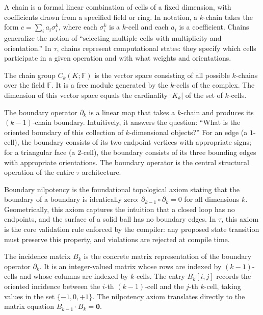 \documentclass[manuscript, nonacm, review=false]{acmart}
\theoremstyle{definition}
\theoremstyle{plain}
\newcommand{\F}{\mathbb{F}}
\newcommand{\toposLang}{\ensuremath{\tau}\text{-Lang}}
\begin{document}
\begin{description}[style=unboxed, leftmargin=0cm, font=\bfseries]
\item[Chain]
A chain is a formal linear combination of cells of a fixed dimension, with coefficients drawn from a specified field or ring. In notation, a $k$-chain takes the form $c = \sum_{i} a_i \sigma_i^k$, where each $\sigma_i^k$ is a $k$-cell and each $a_i$ is a coefficient. Chains generalize the notion of ``selecting multiple cells with multiplicity and orientation.'' In \toposLang{}, chains represent computational states: they specify which cells participate in a given operation and with what weights and orientations.

\item[Chain Group]
The chain group $C_k(K; \F)$ is the vector space consisting of all possible $k$-chains over the field $\F$. It is a free module generated by the $k$-cells of the complex. The dimension of this vector space equals the cardinality $|K_k|$ of the set of $k$-cells.

\item[Boundary Operator]
The boundary operator $\partial_k$ is a linear map that takes a $k$-chain and produces its $(k-1)$-chain boundary. Intuitively, it answers the question: ``What is the oriented boundary of this collection of $k$-dimensional objects?'' For an edge (a $1$-cell), the boundary consists of its two endpoint vertices with appropriate signs; for a triangular face (a $2$-cell), the boundary consists of its three bounding edges with appropriate orientations. The boundary operator is the central structural operation of the entire \toposLang{} architecture.

\item[Boundary Nilpotency]
Boundary nilpotency is the foundational topological axiom stating that the boundary of a boundary is identically zero: $\partial_{k-1} \circ \partial_k = 0$ for all dimensions $k$. Geometrically, this axiom captures the intuition that a closed loop has no endpoints, and the surface of a solid ball has no boundary edges. In \toposLang{}, this axiom is the core validation rule enforced by the compiler: any proposed state transition must preserve this property, and violations are rejected at compile time.

\item[Incidence Matrix]
The incidence matrix $B_k$ is the concrete matrix representation of the boundary operator $\partial_k$. It is an integer-valued matrix whose rows are indexed by $(k-1)$-cells and whose columns are indexed by $k$-cells. The entry $B_k[i,j]$ records the oriented incidence between the $i$-th $(k-1)$-cell and the $j$-th $k$-cell, taking values in the set $\{-1, 0, +1\}$. The nilpotency axiom translates directly to the matrix equation $B_{k-1} \cdot B_k = \mathbf{0}$.


\end{description}
\end{document}
